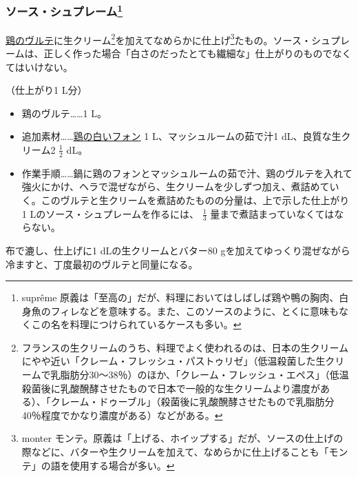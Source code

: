 \begin{recette}
\hypertarget{sauce-supreme}{%
\subsubsection[ソース・シュプレーム]{\texorpdfstring{ソース・シュプレーム\footnote{suprême
  原義は「至高の」だが、料理においてはしばしば鶏や鴨の胸肉、白身魚のフィレなどを意味する。また、このソースのように、とくに意味もなくこの名を料理につけられているケースも多い。}}{ソース・シュプレーム}}\label{sauce-supreme}}


 

\protect\hyperlink{veloute-de-volaille}{鶏のヴルテ}に生クリーム\footnote{フランスの生クリームのうち、料理でよく使われるのは、日本の生クリームにやや近い「クレーム・フレッシュ・パストゥリゼ」（低温殺菌した生クリームで乳脂肪分30〜38％）のほか、「クレーム・フレッシュ・エペス」（低温殺菌後に乳酸醗酵させたもので日本で一般的な生クリームより濃度がある）、「クレーム・ドゥーブル」（殺菌後に乳酸醗酵させたもので乳脂肪分40％程度でかなり濃度がある）などがある。}を加えてなめらかに仕上げ\footnote{monter
  モンテ。原義は「上げる、ホイップする」だが、ソースの仕上げの際などに、バターや生クリームを加えて、なめらかに仕上げることも「モンテ」の語を使用する場合が多い。}たもの。ソース・シュプレームは、正しく作った場合「白さのだったとても繊細な」仕上がりのものでなくてはいけない。

（仕上がり1 L分）

\begin{itemize}
\item
  鶏のヴルテ\ldots{}\ldots{}1 L。
\item
  追加素材\ldots{}\ldots{}\protect\hyperlink{fonds-de-volaille}{鶏の白いフォン}
  1 L、マッシュルームの茹で汁1 dL、良質な生クリーム2 \(\frac{1}{2}\)
  dL。
\item
  作業手順\ldots{}\ldots{}鍋に鶏のフォンとマッシュルームの茹で汁、鶏のヴルテを入れて強火にかけ、ヘラで混ぜながら、生クリームを少しずつ加え、煮詰めていく。このヴルテと生クリームを煮詰めたものの分量は、上で示した仕上がり
  1 Lのソース・シュプレームを作るには、 \(\frac{1}{3}\)
  量まで煮詰まっていなくてはならない。
\end{itemize}

布で漉し、仕上げに1 dLの生クリームとバター80
gを加えてゆっくり混ぜながら冷ますと、丁度最初のヴルテと同量になる。


\end{recette}
